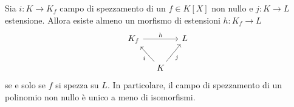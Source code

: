 
\begin{teor}\label{teor:UnicitaCampoDiSpezzamento}
Sia $i : K \to K_f$ campo di spezzamento di un $f \in K[X]$ non nullo e $j : K \to L$ estensione. Allora esiste almeno un morfismo di estensioni $h : K_f \to L$
\[\begin{tikzcd}[column sep=small]
K_f \ar["h", rr] & & L \\
& K \ar["i", ul] \ar["j", ur, swap]
\end{tikzcd}\]
se e solo se $f$ si spezza su $L$. In particolare, il campo di spezzamento di un polinomio non nullo è unico a meno di isomorfismi. 
\end{teor}


